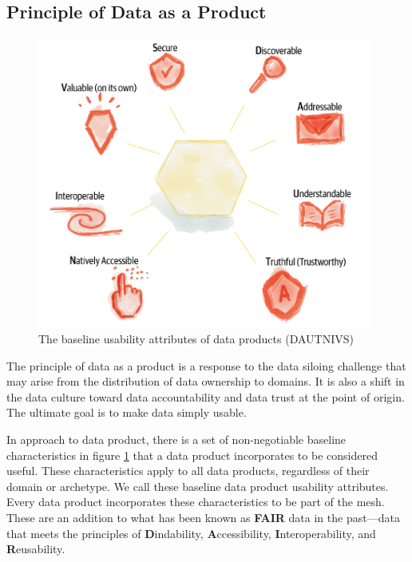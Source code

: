 \documentclass[12pt, a4paper]{book}
\begin{document}
\subsection{Principle of Data as a Product}
\begin{figure}[h]
	\centering
	\includegraphics[width=11cm]{dautnivs.png}
	\caption{The baseline usability attributes of data products (DAUTNIVS)}
	\label{dautnivs}
\end{figure}

The principle of data as a product is a response to the data siloing challenge that may arise from the distribution of data ownership to domains. It is also a shift in the data culture toward data accountability and data trust at the point of origin. The ultimate goal is to make data simply usable.

In approach to data product, there is a set of non-negotiable baseline characteristics in figure \ref{dautnivs} that a data product incorporates to be considered useful. These characteristics apply to all data products, regardless of their domain or archetype. We call these baseline data product usability attributes. Every data product incorporates these characteristics to be part of the mesh. These are an addition to what has been known as \textbf{FAIR} data in the past—data that meets the principles of \textbf{D}indability, \textbf{A}ccessibility,  \textbf{I}nteroperability, and \textbf{R}eusability. \cite{fair}
\end{document}
